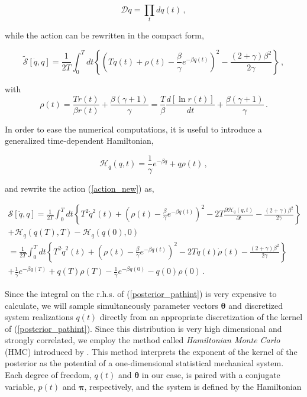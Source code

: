 \documentclass[11pt, a4paper]{article}
\newcommand{\bt}{\pmb\theta}
\newcommand{\dt}{\mathit{dt}}
\begin{document}
\begin{equation}\label{pathmeasure_q}
{\mathcal Dq}
=
\prod_{t}
dq(t)\,,
\end{equation}

while the action can be rewritten in the compact form,

\begin{equation}\label{action_new}
\tilde {\mathcal S}[\dot{q},q]
=
\frac{1}{2T}
\int_0^T \dt \left\{\left(
    T\dot q(t)
    +
    \rho(t)
    -
    \frac{\beta}{\gamma}e^{-\beta q(t)}\right)^2
    -
    \frac{(2+\gamma)\beta^2}{2\gamma}
\right\} \,,
\end{equation}

with
\begin{equation}\label{rho}
\rho(t)=\frac{T\dot r(t)}{\beta r(t)}+\frac{\beta(\gamma+1)}{\gamma}
=
\frac{T}{\beta}\frac{d \left[\ln r(t)\right]}{dt}+\frac{\beta(\gamma+1)}{\gamma}\,.
\end{equation}

In order to ease the numerical computations, it is useful to introduce a generalized time-dependent Hamiltonian,

\begin{equation}\label{H}
  \mathcal{H}_q(q,t)
  =
  \frac{1}{\gamma}e^{-\beta q}+q\rho(t)\,,
\end{equation}

and rewrite the action (\ref{action_new}) as,

\begin{multline}\label{action_final}
{\mathcal S}[\dot{q},q]
=
\frac{1}{2T}
\int_0^T dt\left\{
    T^2\dot q^2(t) +
    \left(\rho(t)-\frac{\beta}{\gamma}e^{-\beta q(t)}\right)^2 -
    2T\frac{\partial \mathcal{H}_q(q,t)}{\partial t} -
     \frac{(2+\gamma)\beta^2}{2\gamma}
\right\}
\\
+ \mathcal{H}_q(q(T),T) - \mathcal{H}_q(q(0),0)
\\
= \frac{1}{2T}
\int_0^T dt\left\{
    T^2\dot q^2(t) +
    \left(\rho(t)-\frac{\beta}{\gamma}e^{-\beta q(t)}\right)^2 -
    2Tq(t)\dot\rho(t) -
    \frac{(2+\gamma)\beta^2}{2\gamma}
\right\}
\\
+
    \frac{1}{\gamma}e^{-\beta q(T)}+q(T)\rho(T)
   -\frac{1}{\gamma}e^{-\beta q(0)}-q(0)\rho(0)
\,.
\end{multline}

Since the integral on the r.h.s. of (\ref{posterior_pathint}) is very expensive to calculate, we will sample simultaneously parameter vectors $\bt$ and discretized system realizations $q(t)$ directly from an appropriate discretization of the kernel of (\ref{posterior_pathint}).
Since this distribution is very high dimensional and strongly correlated, we employ the method called {\em Hamiltonian Monte Carlo} (HMC) introduced by \cite{duane_1987_HMC}.
This method interprets the exponent of the kernel of the posterior as the potential of a one-dimensional statistical mechanical system. Each degree of freedom, $q(t)$ and $\bt$ in our case, is paired with a conjugate variable, $p(t)$ and ${\pmb\pi}$, respectively, and the system is defined by the  Hamiltonian
\end{document}
